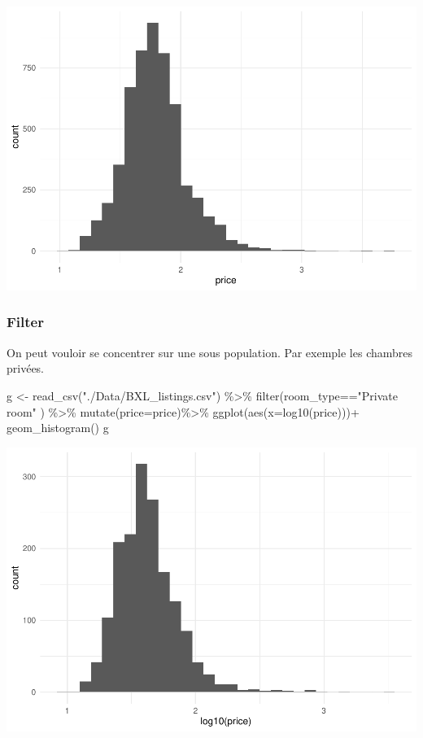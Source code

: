 \documentclass[
]{book}
\newenvironment{Shaded}{\begin{snugshade}}{\end{snugshade}}
\newcommand{\AttributeTok}[1]{\textcolor[rgb]{0.77,0.63,0.00}{#1}}
\newcommand{\FunctionTok}[1]{\textcolor[rgb]{0.00,0.00,0.00}{#1}}
\newcommand{\NormalTok}[1]{#1}
\newcommand{\OtherTok}[1]{\textcolor[rgb]{0.56,0.35,0.01}{#1}}
\newcommand{\SpecialCharTok}[1]{\textcolor[rgb]{0.00,0.00,0.00}{#1}}
\newcommand{\StringTok}[1]{\textcolor[rgb]{0.31,0.60,0.02}{#1}}
\begin{document}
\includegraphics{bookdown-demo_files/figure-latex/0204-1.pdf}

\hypertarget{filter}{%
\subsubsection{Filter}\label{filter}}

On peut vouloir se concentrer sur une sous population. Par exemple les chambres privées.

\begin{Shaded}
\begin{Highlighting}[]
\NormalTok{g }\OtherTok{\textless{}{-}} \FunctionTok{read\_csv}\NormalTok{(}\StringTok{"./Data/BXL\_listings.csv"}\NormalTok{) }\SpecialCharTok{\%\textgreater{}\%} 
  \FunctionTok{filter}\NormalTok{(room\_type}\SpecialCharTok{==}\StringTok{"Private room"}\NormalTok{ ) }\SpecialCharTok{\%\textgreater{}\%} 
    \FunctionTok{mutate}\NormalTok{(}\AttributeTok{price=}\NormalTok{price)}\SpecialCharTok{\%\textgreater{}\%}
  \FunctionTok{ggplot}\NormalTok{(}\FunctionTok{aes}\NormalTok{(}\AttributeTok{x=}\FunctionTok{log10}\NormalTok{(price)))}\SpecialCharTok{+}
  \FunctionTok{geom\_histogram}\NormalTok{()}
\NormalTok{g}
\end{Highlighting}
\end{Shaded}

\includegraphics{bookdown-demo_files/figure-latex/0205-1.pdf}
\end{document}
